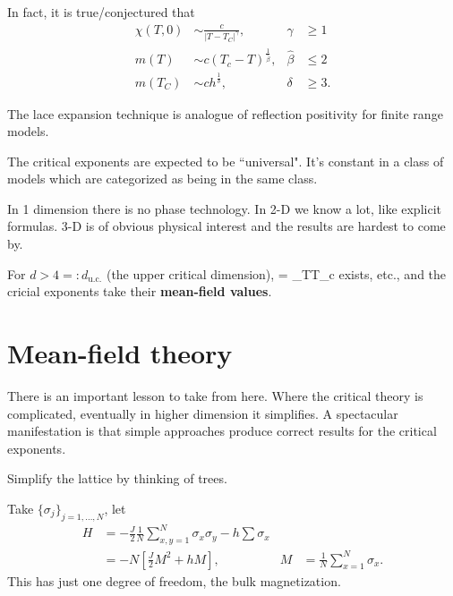 In fact, it is true/conjectured that %
\begin{align}
\chi(T,0) &\sim \frac{c}{|T-T_C|^{\gamma}}, &\gamma &\ge 1\\
m(T) &\sim c(T_c-T)^{\frac{1}{\widehat{\beta}}},&\widehat{\beta} &\le 2\\
m(T_C)&\sim ch^{\frac{1}{\delta}}, &\delta&\ge 3.
\end{align}

The lace expansion technique is analogue of reflection positivity for finite range models.

The critical exponents are expected to be ``universal".
It's constant in a class of models which are categorized as being in the same class.


In 1 dimension there is no phase technology. In 2-D we know a lot, like explicit formulas. 3-D is of obvious physical interest and the results are hardest to come by.

For $d>4=:d_{\text{u.c.}}$ (the upper critical dimension),
\be
\gamma = \lim_{T\searrow T_c} 
\ee
exists, etc., and the cricial exponents take their \textbf{mean-field values}.

\section{Mean-field theory}
There is an important lesson to take from here. Where the critical theory  is complicated, eventually in higher dimension it simplifies. A spectacular manifestation is that simple approaches produce correct results for the critical exponents.

Simplify the lattice by thinking of trees.

Take $\{\sigma_j\}_{j=1,\ldots, N}$, let 
\begin{align}
H &=-\frac{J}{2} \frac{1}{N} \sum_{x,y=1}^{N} \sigma_x\sigma_y - h\sum\sigma_x\\
& = -N\left[ {\frac{J}{2} M^2 + hM} \right], &M&=\frac{1}{N}\sum_{x=1}^{N} \sigma_x.
\end{align}
This has just one degree of freedom, the bulk magnetization.


